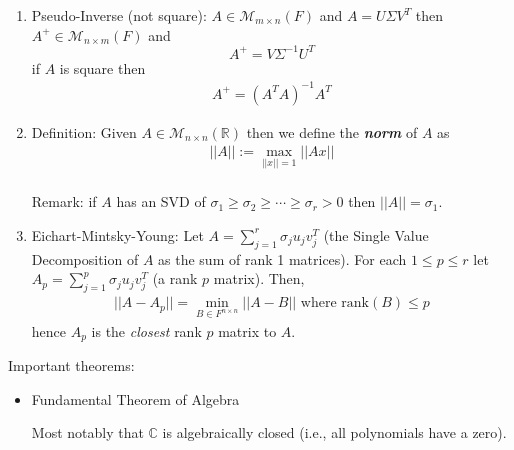 \documentclass[11pt]{amsart}
\theoremstyle{definition}  %
\newcommand{\R}{\mathbb{R}}
\newcommand{\C}{\mathbb{C}}
\newcommand{\rank}{\mathrm{rank}}
\newcommand{\MM}{\mathcal{M}}
\begin{document}
\begin{enumerate}
	\item Pseudo-Inverse (not square): $A \in \MM_{m\times n}(F)$ and $A=U\Sigma V^T$ then $A^+\in \MM_{n\times m}(F)$ and \[A^+=V\Sigma^{-1}U^T\]
	if $A$ is square then
	\begin{align*}
		A^+ = (A^TA)^{-1}A^T
	\end{align*}
	\item Definition: Given $A \in \MM_{n\times n}(\R)$ then we define the \textbf{\textit{norm}} of $A$ as 
	\begin{align*}
		||A|| := \max_{||x||=1} ||Ax||
	\end{align*}\\
	Remark: if $A$ has an SVD of $\sigma_1 \ge \sigma_2 \ge\cdots \ge \sigma_r > 0$ then $||A|| = \sigma_1$.\\
	\item Eichart-Mintsky-Young:  Let $A=\sum_{j=1}^r \sigma_j u_j v_j^T$ (the Single Value Decomposition of $A$ as the sum of rank 1 matrices).  For each $1\le p \le r$ let $A_p=\sum_{j=1}^p \sigma_j u_j v_j^T$ (a rank $p$ matrix).  Then, 
	\begin{align*}
		|| A - A_p|| = \min_{B \in F^{n\times n}} ||A-B|| \text{ where } \rank (B) \le p
	\end{align*}hence $A_p$ is the \textit{closest} rank $p$ matrix to $A$.
\end{enumerate}

Important theorems:
\begin{itemize}
	\item Fundamental Theorem of Algebra
	
		Most notably that $\C$ is algebraically closed (i.e., all polynomials have a zero).
\end{itemize}
\end{document}
